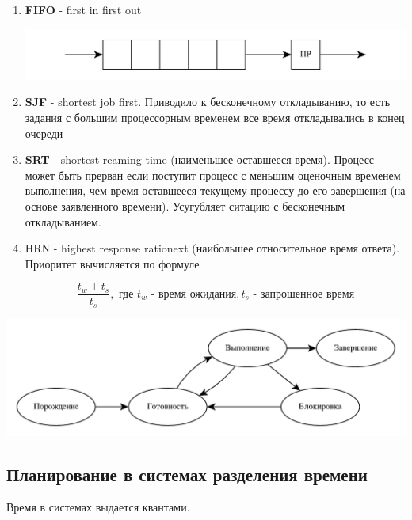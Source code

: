 \documentclass[a4paper, 14pt]{report}
\begin{document}
\begin{enumerate}
    \item \textbf{FIFO} - first in first out

        \includegraphics[scale=0.4]{os3}


    \item \textbf{SJF} - shortest job first. Приводило к бесконечному откладыванию, то есть задания с большим процессорным временем все время откладывались в конец очереди

    \item \textbf{SRT} - shortest reaming time (наименьшее оставшееся время). Процесс может быть прерван если поступит процесс с меньшим оценочным временем выполнения, чем время оставшееся текущему процессу до его завершения (на основе заявленного времени). Усугубляет ситацию с бесконечным откладыванием.

    \item HRN - highest response rationext (наибольшее относительное время ответа). Приоритет вычисляется по формуле

        $$
        \frac{t_w + t_s}{t_s}, \text{ где } t_w \text{ - время ожидания}, t_s \text{ - запрошенное время}
        $$

\end{enumerate}

\includegraphics[scale=0.7]{os4}

\subsection{Планирование в системах разделения времени}

Время в системах выдается квантами.
\end{document}
